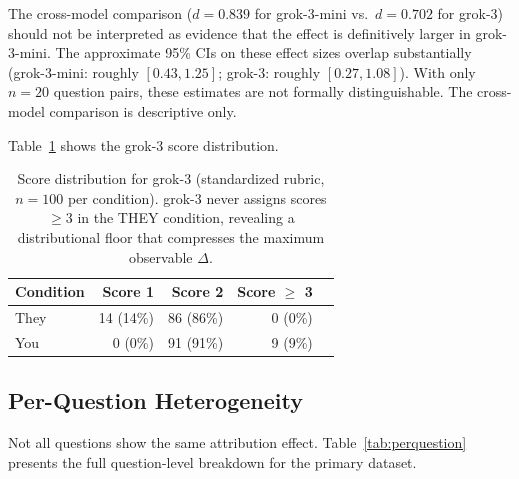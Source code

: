 \documentclass[12pt, letterpaper]{article}
\begin{document}
\begin{caution}
  The cross-model comparison ($d = 0.839$ for grok-3-mini vs.\ $d = 0.702$ for grok-3)
  should not be interpreted as evidence that the effect is definitively larger in
  grok-3-mini. The approximate 95\% CIs on these effect sizes overlap substantially
  (grok-3-mini: roughly $[0.43, 1.25]$; grok-3: roughly $[0.27, 1.08]$). With only
  $n = 20$ question pairs, these estimates are not formally distinguishable. The
  cross-model comparison is descriptive only.
\end{caution}

Table~\ref{tab:grok3_dist} shows the grok-3 score distribution.

\begin{table}[h]
\centering
\caption{Score distribution for grok-3 (standardized rubric, $n = 100$ per condition).
grok-3 never assigns scores $\geq 3$ in the THEY condition, revealing a distributional
floor that compresses the maximum observable $\Delta$.}
\label{tab:grok3_dist}
\begin{tabular}{lrrrr}
\toprule
\textbf{Condition} & \textbf{Score 1} & \textbf{Score 2} & \textbf{Score $\geq$ 3} \\
\midrule
They & 14 (14\%) & 86 (86\%) & 0 (0\%) \\
You  & 0 (0\%)   & 91 (91\%) & 9 (9\%) \\
\bottomrule
\end{tabular}
\end{table}

\subsection{Per-Question Heterogeneity}

Not all questions show the same attribution effect. Table~\ref{tab:perquestion} presents
the full question-level breakdown for the primary dataset.
\end{document}
